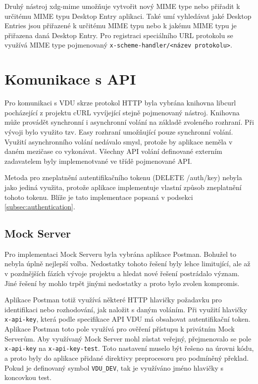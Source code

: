 Druhý nástroj xdg-mime umožňuje vytvořit nový MIME type nebo přiřadit k určitému MIME typu Desktop Entry aplikaci. Také umí vyhledávat jaké Desktop Entries jsou přiřazené
k určitému MIME typu nebo k jakému MIME typu je přiřazena daná Desktop Entry. Pro registraci speciálního URL protokolu se využívá MIME type pojmenovaný 
\texttt{\mbox{x-scheme-handler/<název protokolu>}}.

\section{Komunikace s API}

Pro komunikaci s VDU skrze protokol HTTP byla vybrána knihovna libcurl pocházející z projektu cURL vyvíjející stejně pojmenovaný nástroj. Knihovna může provádět
synchronní i asynchronní volání na základě zvoleného rozhraní. Při vývoji bylo využito tzv. Easy rozhraní umožňující pouze synchronní volání. Využití asynchronního volání
nedávalo smysl, protože by aplikace neměla v daném mezičase co vykonávat. Všechny API volání definované externím zadavatelem byly implemenotvané ve třídě pojmenované API.

Metoda pro zneplatnění autentifikačního tokenu (DELETE /auth/key) nebyla jako jediná využita, protože aplikace implementuje vlastní způsob zneplatnění tohoto tokenu. Blíže 
je tato implementace popsaná v podsekci \ref{subsec:authentication}.

\subsection{Mock Server}

Pro implementaci Mock Serveru byla vybrána aplikace Postman. Bohužel to nebyla úplně nejlepší volba. Nedostatky tohoto řešení byly lehce limitující, ale až v pozdnějších
fázích vývoje projektu a hledat nové řešení postrádalo význam. Jiné řešení by mohlo trpět jinými nedostatky a proto bylo zvolen kompromis.

Aplikace Postman totiž využívá některé HTTP hlavičky požadavku pro identifikaci nebo rozhodování, jak naložit s daným voláním. Při využití hlavičky \texttt{x-api-key}, která
podle specifikace API VDU má obsahovat autentifikační token. Aplikace Postman toto pole využívá pro ověření přístupu k privátním Mock Serverům. Aby využívaný
Mock Server mohl zůstat veřejný, přejmenovalo se pole \texttt{x-api-key} na \texttt{x-api-key-test}. Toto nastavení muselo být řešeno na úrovni kódu, a proto byly do aplikace 
přidané direktivy preprocesoru pro podmíněný překlad. Pokud je definovaný symbol \texttt{VDU\_DEV}, tak je využíváno jméno hlavičky s koncovkou test.

